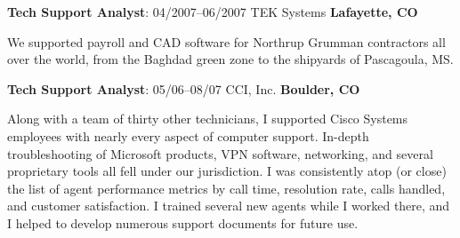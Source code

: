 \documentclass[letterpaper,12pt]{article}
\begin{document}
\begin{flushleft}
\textbf{Tech Support Analyst}: 04/2007--06/2007 TEK Systems 
\textbf{Lafayette, CO}
\end{flushleft}

We supported payroll and CAD software for Northrup Grumman contractors all over
the world, from the Baghdad green zone to the shipyards of Pascagoula, MS.

\begin{flushleft}
\textbf{Tech Support Analyst}: 05/06--08/07 CCI, Inc. \textbf{Boulder, CO}
\end{flushleft}

Along with a team of thirty other technicians, I supported Cisco Systems
employees with nearly every aspect of computer support. In-depth
troubleshooting of Microsoft products, VPN software, networking, and several
proprietary tools all fell under our jurisdiction. I was consistently atop
(or close) the list of agent performance metrics by call time, resolution rate,
calls handled, and customer satisfaction. I trained several new agents while
I worked there, and I helped to develop numerous support documents for future
use.
\end{document}
